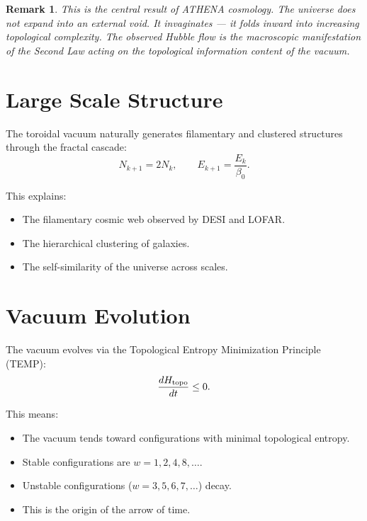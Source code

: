 \documentclass[12pt,oneside]{book}
\newtheorem{remark}{Remark}[chapter]
\begin{document}
\begin{remark}
This is the central result of ATHENA cosmology. The universe does not expand into an external void. It invaginates — it folds inward into increasing topological complexity. The observed Hubble flow is the macroscopic manifestation of the Second Law acting on the topological information content of the vacuum.
\end{remark}

\section{Large Scale Structure}

The toroidal vacuum naturally generates filamentary and clustered structures through the fractal cascade:
\[
N_{k+1} = 2 N_k, \qquad E_{k+1} = \frac{E_k}{\beta_0}.
\]

This explains:
\begin{itemize}
    \item The filamentary cosmic web observed by DESI and LOFAR.
    \item The hierarchical clustering of galaxies.
    \item The self-similarity of the universe across scales.
\end{itemize}

\section{Vacuum Evolution}

The vacuum evolves via the Topological Entropy Minimization Principle (TEMP):
\[
\frac{dH_{\rm topo}}{dt} \leq 0.
\]

This means:
\begin{itemize}
    \item The vacuum tends toward configurations with minimal topological entropy.
    \item Stable configurations are $w = 1, 2, 4, 8, \dots$.
    \item Unstable configurations ($w = 3, 5, 6, 7, \dots$) decay.
    \item This is the origin of the arrow of time.
\end{itemize}
\end{document}
